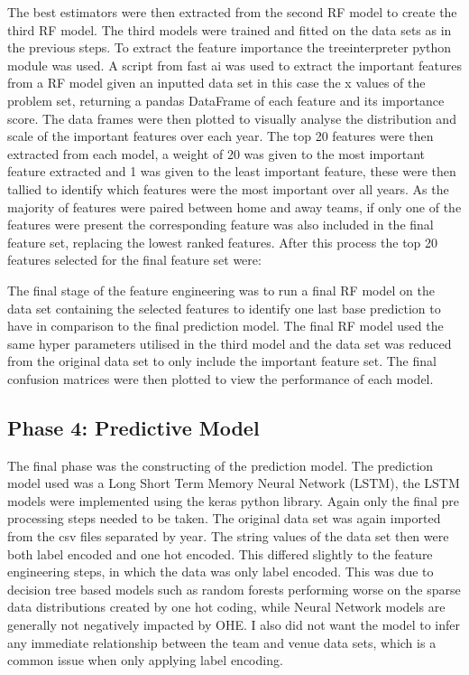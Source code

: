 \documentclass{imc-inf}
\begin{document}
	The best estimators were then extracted from the second RF model to create the third RF model. The third models were trained and fitted on the data sets as in the previous steps. To extract the feature importance the treeinterpreter python module was used. A script from fast ai was used to extract the important features from a RF model given an inputted data set in this case the x values of the problem set, returning a pandas DataFrame of each feature and its importance score. The data frames were then plotted to visually analyse the distribution and scale of the important features over each year. The top 20 features were then extracted from each model, a weight of 20 was given to the most important feature extracted and 1 was given to the least important feature, these were then tallied to identify which features were the most important over all years. As the majority of features were paired between home and away teams, if only one of the features were present the corresponding feature was also included in the final feature set, replacing the lowest ranked features. After this process the top 20 features selected for the final feature set were: 
	\newline
	
	The final stage of the feature engineering was to run a final RF model on the data set containing the selected features to identify one last base prediction to have in comparison to the final prediction model. The final RF model used the same hyper parameters utilised in the third model and the data set was reduced from the original data set to only include the important feature set.
	The final confusion matrices were then plotted to view the performance of each model.
		
	\subsection{Phase 4: Predictive Model}
	The final phase was the constructing of the prediction model. The prediction model used was a Long Short Term Memory Neural Network (LSTM), the LSTM models were implemented using the keras python library. Again only the final pre processing steps needed to be taken. The original data set was again imported from the csv files separated by year. The string values of the data set then were both label encoded and one hot encoded. This differed slightly to the feature engineering steps, in which the data was only label encoded. This was due to decision tree based models such as random forests performing worse on the sparse data distributions created by one hot coding, while Neural Network models are generally not negatively impacted by OHE. I also did not want the model to infer any immediate relationship between the team and venue data sets, which is a common issue when only applying label encoding. 
	\newline
	
\end{document}

